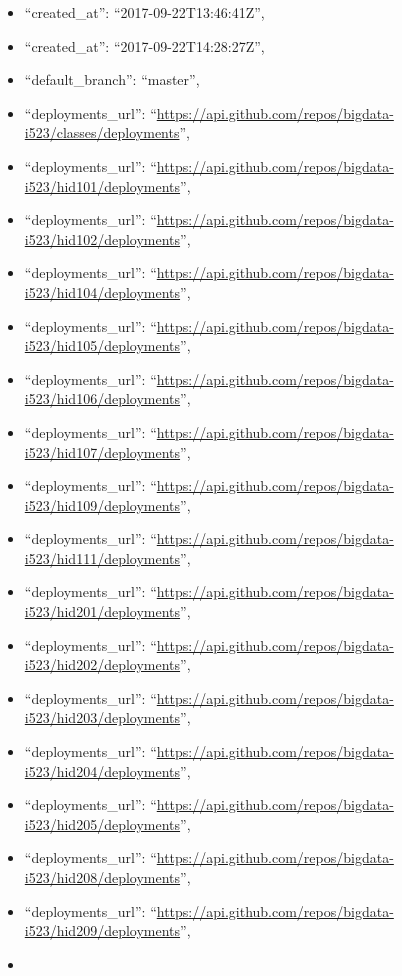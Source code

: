 \begin{itemize}
\item
  ``created\_at'': ``2017-09-22T13:46:41Z'',
\item
  ``created\_at'': ``2017-09-22T14:28:27Z'',
\item
  ``default\_branch'': ``master'',
\item
  ``deployments\_url'':
  ``\url{https://api.github.com/repos/bigdata-i523/classes/deployments}'',
\item
  ``deployments\_url'':
  ``\url{https://api.github.com/repos/bigdata-i523/hid101/deployments}'',
\item
  ``deployments\_url'':
  ``\url{https://api.github.com/repos/bigdata-i523/hid102/deployments}'',
\item
  ``deployments\_url'':
  ``\url{https://api.github.com/repos/bigdata-i523/hid104/deployments}'',
\item
  ``deployments\_url'':
  ``\url{https://api.github.com/repos/bigdata-i523/hid105/deployments}'',
\item
  ``deployments\_url'':
  ``\url{https://api.github.com/repos/bigdata-i523/hid106/deployments}'',
\item
  ``deployments\_url'':
  ``\url{https://api.github.com/repos/bigdata-i523/hid107/deployments}'',
\item
  ``deployments\_url'':
  ``\url{https://api.github.com/repos/bigdata-i523/hid109/deployments}'',
\item
  ``deployments\_url'':
  ``\url{https://api.github.com/repos/bigdata-i523/hid111/deployments}'',
\item
  ``deployments\_url'':
  ``\url{https://api.github.com/repos/bigdata-i523/hid201/deployments}'',
\item
  ``deployments\_url'':
  ``\url{https://api.github.com/repos/bigdata-i523/hid202/deployments}'',
\item
  ``deployments\_url'':
  ``\url{https://api.github.com/repos/bigdata-i523/hid203/deployments}'',
\item
  ``deployments\_url'':
  ``\url{https://api.github.com/repos/bigdata-i523/hid204/deployments}'',
\item
  ``deployments\_url'':
  ``\url{https://api.github.com/repos/bigdata-i523/hid205/deployments}'',
\item
  ``deployments\_url'':
  ``\url{https://api.github.com/repos/bigdata-i523/hid208/deployments}'',
\item
  ``deployments\_url'':
  ``\url{https://api.github.com/repos/bigdata-i523/hid209/deployments}'',
\item

\end{itemize}
